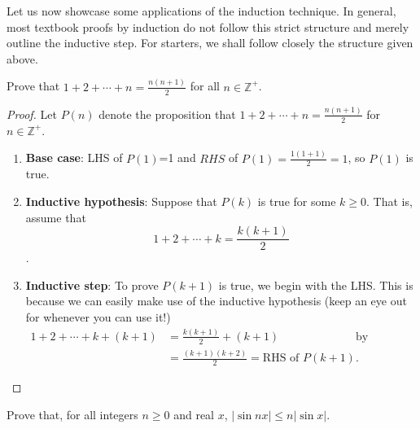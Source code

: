 \documentclass[../jarvis.tex]{subfiles}
\begin{document}
Let us now showcase some applications of the induction technique. In general, most textbook proofs by induction do not follow this strict structure and merely outline the inductive step. For starters, we shall follow closely the structure given above.
\begin{example}[Classic]
    Prove that $1+2+\cdots+n=\frac{n(n+1)}{2}$ for all $n\in\mathbb{Z}^+$.
\end{example}
\begin{proof}
    Let $P(n)$ denote the proposition that $1+2+\cdots+n=\frac{n(n+1)}{2}$ for $n\in\mathbb{Z}^+$.

    \begin{enumerate}
        \item \textbf{Base case}: LHS of $P(1)$=1 and $RHS$ of $P(1)=\frac{1(1+1)}{2}=1$, so $P(1)$ is true.
        \item \textbf{Inductive hypothesis}: Suppose that $P(k)$ is true for some $k\geq 0$. That is, assume that $$1+2+\cdots+k=\frac{k(k+1)}{2}$$.
        \item \textbf{Inductive step}: To prove $P(k+1)$ is true, we begin with the LHS. This is because we can easily make use of the inductive hypothesis (keep an eye out for whenever you can use it!)
        \begin{align*}
            1+2+\cdots+k+(k+1) &= \frac{k(k+1)}{2}+(k+1) &\text{by inductive hypothesis} \\
            &=\frac{(k+1)(k+2)}{2} =\text{RHS of $P(k+1)$.}
        \end{align*} 
    \end{enumerate}
\end{proof}
\begin{example}[Classic]
    Prove that, for all integers $n \geq 0$ and real $x$, $|\sin{nx}|\leq n|\sin{x}|$.
\end{example}
\end{document}
